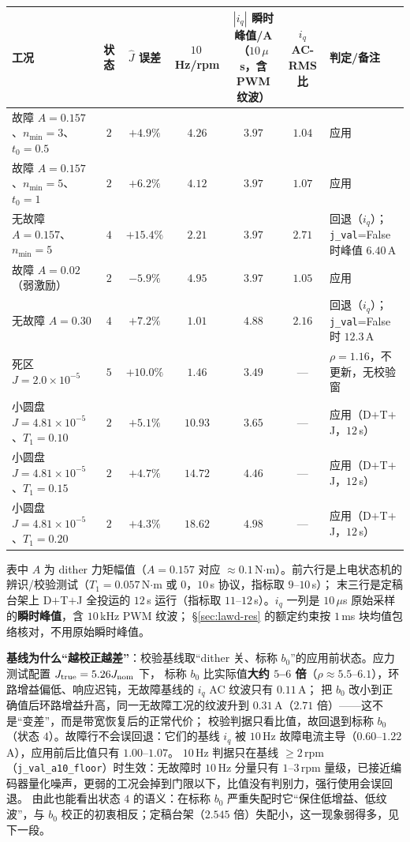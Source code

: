 \documentclass[11pt,a4paper]{article}
\theoremstyle{remark}\newtheorem{remark}{注}
\begin{document}
\begin{center}\scriptsize
\begin{tabular}{@{}p{3.2cm}cccccp{2.4cm}@{}}
\toprule
工况 & 状态 & $\hat J$ 误差 & $10$\,Hz/rpm & \shortstack[c]{$|i_q|$ 瞬时峰值/A\\（$10$\,$\mu$s，含 PWM 纹波）} & $i_q$ AC-RMS 比 & 判定/备注\\
\midrule
故障 $A=0.157$、$n_{\min}=3$、$t_0=0.5$ & $2$ & $+4.9\%$ & $4.26$ & $3.97$ & $1.04$ & 应用\\
故障 $A=0.157$、$n_{\min}=5$、$t_0=1$ & $2$ & $+6.2\%$ & $4.12$ & $3.97$ & $1.07$ & 应用\\
无故障 $A=0.157$、$n_{\min}=5$ & $4$ & $+15.4\%$ & $2.21$ & $3.97$ & $2.71$ & 回退（$i_q$）；\texttt{j\_val}=False 时峰值 $6.40$\,A\\
故障 $A=0.02$（弱激励） & $2$ & $-5.9\%$ & $4.95$ & $3.97$ & $1.05$ & 应用\\
无故障 $A=0.30$ & $4$ & $+7.2\%$ & $1.01$ & $4.88$ & $2.16$ & 回退（$i_q$）；\texttt{j\_val}=False 时 $12.3$\,A\\
死区 $J=2.0\times10^{-5}$ & $5$ & $+10.0\%$ & $1.46$ & $3.49$ & --- & $\rho=1.16$，不更新，无校验窗\\
小圆盘 $J=4.81\times10^{-5}$、$T_1=0.10$ & $2$ & $+5.1\%$ & $10.93$ & $3.65$ & --- & 应用（D$+$T$+$J，$12$\,s）\\
小圆盘 $J=4.81\times10^{-5}$、$T_1=0.15$ & $2$ & $+4.7\%$ & $14.72$ & $4.46$ & --- & 应用（D$+$T$+$J，$12$\,s）\\
小圆盘 $J=4.81\times10^{-5}$、$T_1=0.20$ & $2$ & $+4.3\%$ & $18.62$ & $4.98$ & --- & 应用（D$+$T$+$J，$12$\,s）\\
\bottomrule
\end{tabular}
\end{center}

表中 $A$ 为 dither 力矩幅值（$A=0.157$ 对应 $\approx0.1$\,N$\cdot$m）。前六行是上电状态机的辨识/校验测试（$T_1=0.057$\,N$\cdot$m 或 $0$，$10$\,s 协议，指标取 $9$--$10$\,s）；
末三行是定稿台架上 D$+$T$+$J 全投运的 $12$\,s 运行（指标取 $11$--$12$\,s）。$i_q$ 一列是 $10$\,$\mu$s 原始采样的\textbf{瞬时峰值}，含 $10$\,kHz PWM 纹波；
§\ref{sec:lawd-res} 的额定约束按 $1$\,ms 块均值包络核对，不用原始瞬时峰值。

\textbf{基线为什么“越校正越差”}：校验基线取“dither 关、标称 $b_0$”的应用前状态。应力测试配置 $J_{\rm true}=5.26J_{\rm nom}$ 下，
标称 $b_0$ 比实际值\textbf{大约 $5$--$6$ 倍}（$\rho\approx5.5$--$6.1$），环路增益偏低、响应迟钝，无故障基线的 $i_q$ AC 纹波只有 $0.11$\,A；
把 $b_0$ 改小到正确值后环路增益升高，同一无故障工况的纹波升到 $0.31$\,A（$2.71$ 倍）——这不是“变差”，而是带宽恢复后的正常代价；
校验判据只看比值，故回退到标称 $b_0$（状态 $4$）。故障行不会误回退：它们的基线 $i_q$ 被 $10$\,Hz 故障电流主导（$0.60$--$1.22$\,A），应用前后比值只有 $1.00$--$1.07$。
$10$\,Hz 判据只在基线 $\ge2$\,rpm（\texttt{j\_val\_a10\_floor}）时生效：无故障时 $10$\,Hz 分量只有 $1$--$3$\,rpm 量级，已接近编码器量化噪声，更弱的工况会掉到门限以下，比值没有判别力，强行使用会误回退。
由此也能看出状态 $4$ 的语义：在标称 $b_0$ 严重失配时它“保住低增益、低纹波”，与 $b_0$ 校正的初衷相反；定稿台架（$2.545$ 倍）失配小，这一现象弱得多，见下一段。
\end{document}
